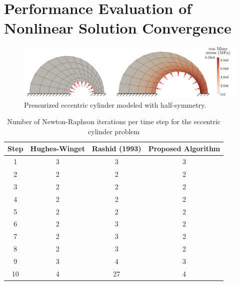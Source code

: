 \section{Performance Evaluation of Nonlinear Solution Convergence}
%

\begin{figure}[!tbhp]
\centering
\includegraphics[scale=0.28]{media/ring_problem}
\caption{Pressurized eccentric cylinder modeled with half-symmetry.}
\label{fig.ring}
\end{figure}

\begin{table}[]
\centering
\caption{Number of Newton-Raphson iterations per time step for the eccentric cylinder problem}
\label{tab.ring}
\begin{tabular}{|c|c|c|c|}
\hline
Step & Hughes-Winget & Rashid (1993) & Proposed Algorithm  \\ \hline
1  & 3 & 3  & 3 \\ \hline
2  & 2 & 2  & 2 \\ \hline
3  & 2 & 2  & 2 \\ \hline
4  & 2 & 2  & 2 \\ \hline
5  & 2 & 2  & 2 \\ \hline
6  & 2 & 3  & 2 \\ \hline
7  & 2 & 3  & 2 \\ \hline
8  & 2 & 3  & 2 \\ \hline
9  & 3 & 4  & 3 \\ \hline
10 & 4 & 27 & 4\\ \hline
\end{tabular}
\end{table}

